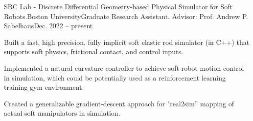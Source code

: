 \begin{rSubsection}{SRC Lab -  Discrete Differential Geometry-based
Physical Simulator for Soft Robots.}{Boston University}{Graduate Research Assistant. Advisor: Prof. Andrew P. Sabelhaus}{Dec. 2022 -- present}
\item Built a fast, high precision, fully implicit soft elastic rod simulator (in C++) that supports soft physics, frictional contact, and control inputs. 
\item Implemented a natural curvature controller to achieve soft robot motion control in simulation, which could be potentially used as a reinforcement learning training gym environment.
\item Created a generalizable gradient-descent approach for "real2sim” mapping of actual soft manipulators in simulation.
\end{rSubsection}